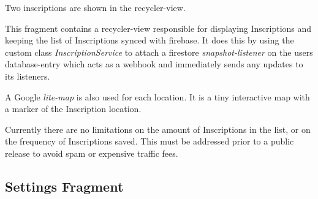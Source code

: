 \documentclass[]{article}
\begin{document}
\begin{flushleft}
\begin{floatingfigure}[r]{0.3\linewidth}
	\caption{Two inscriptions are shown in the recycler-view.}
	\label{fig:inscription}
	\vspace{\dimexpr0.3\baselineskip-\topskip}
\end{floatingfigure}
\medskip
This fragment contains a recycler-view responsible for displaying Inscriptions and keeping the list of Inscriptions synced with firebase. It does this by using the custom class \textit{InscriptionService} to attach a firestore \textit{snapshot-listener} on the users database-entry which acts as a webhook and immediately sends any updates to its listeners.\medskip


A Google \textit{lite-map} is also used for each location. It is a tiny interactive map with a marker of the Inscription location\parencite{lite}.\medskip


Currently there are no limitations on the amount of Inscriptions in the list, or on the frequency of Inscriptions saved. This must be addressed prior to a public release to avoid spam or expensive traffic fees.
\newpage

\left\subsection{Settings Fragment}


\end{flushleft}
\end{document}
